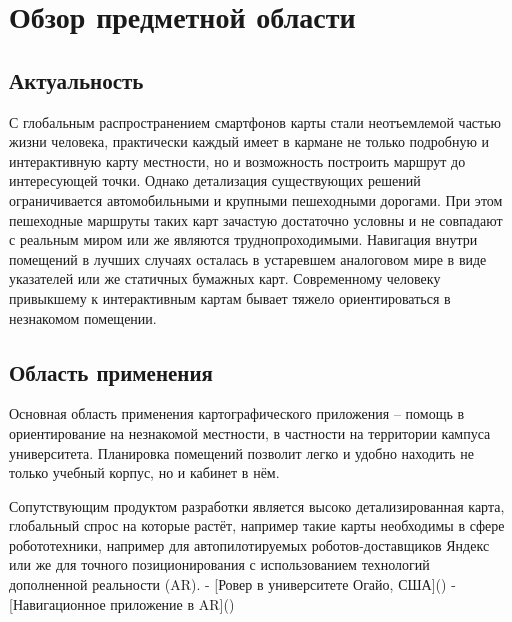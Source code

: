 
\chapter{Обзор предметной области}
  \section{Актуальность}
    С глобальным распространением смартфонов карты стали неотъемлемой частью жизни человека, практически каждый имеет в кармане не только подробную и интерактивную карту местности, но и возможность построить маршрут до интересующей точки. Однако детализация существующих решений ограничивается автомобильными и крупными пешеходными дорогами. При этом пешеходные маршруты таких карт зачастую достаточно условны и не совпадают с реальным миром или же являются труднопроходимыми.
    Навигация внутри помещений в лучших случаях осталась в устаревшем аналоговом мире в виде указателей или же статичных бумажных карт. Современному человеку привыкшему к интерактивным картам бывает тяжело ориентироваться в незнакомом помещении.


  \section{Область применения}
    Основная область применения картографического приложения -- помощь в ориентирование на незнакомой местности, в частности на территории кампуса университета. Планировка помещений позволит легко и удобно находить не только учебный корпус, но и кабинет в нём.

    Сопутствующим продуктом разработки является высоко детализированная карта, глобальный спрос на которые растёт, например такие карты необходимы в сфере робототехники, например для автопилотируемых роботов-доставщиков Яндекс или же для точного позиционирования с использованием технологий дополненной реальности (AR).
    - [Ровер в университете Огайо, США]()
    - [Навигационное приложение в AR]()

